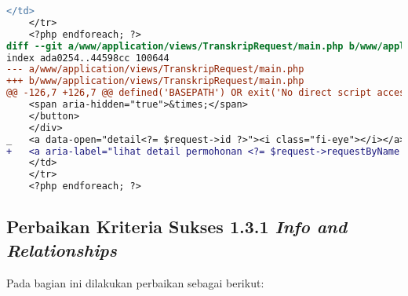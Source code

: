 \begin{lstlisting}[frame=single, label={lst:perbaikan_1.1.1_ikon_tanpa_nama}, language=diff, caption=Perbaikan Kriteria Sukses 1.1.1]
    </td>
    </tr>
    <?php endforeach; ?>
diff --git a/www/application/views/TranskripRequest/main.php b/www/application/views/TranskripRequest/main.php
index ada0254..44598cc 100644
--- a/www/application/views/TranskripRequest/main.php
+++ b/www/application/views/TranskripRequest/main.php
@@ -126,7 +126,7 @@ defined('BASEPATH') OR exit('No direct script access allowed');
    <span aria-hidden="true">&times;</span>
    </button>
    </div>
_   <a data-open="detail<?= $request->id ?>"><i class="fi-eye"></i></a>
+   <a aria-label="lihat detail permohonan <?= $request->requestByName ?>" data-open="detail<?= $request->id ?>"><i class="fi-eye"></i></a>
    </td>
    </tr>
    <?php endforeach; ?>
\end{lstlisting}

\subsection{Perbaikan Kriteria Sukses 1.3.1 \textit{Info and Relationships}}
\label{subsec:perbaikan_kriteria_sukses_1.3.1}
Pada bagian ini dilakukan perbaikan sebagai berikut:

